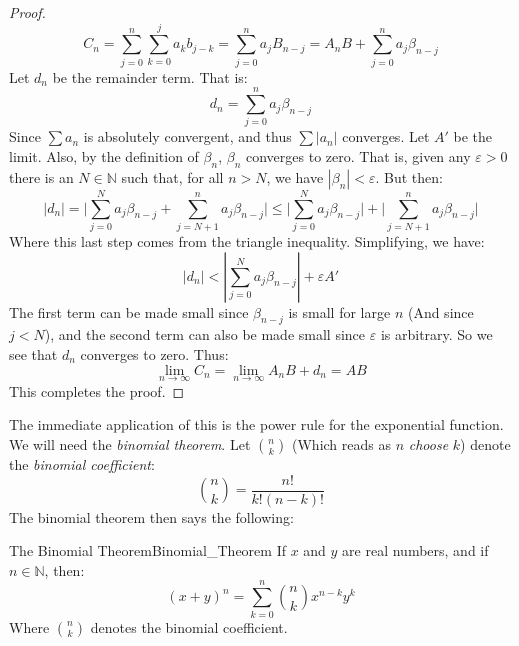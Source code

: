 \begin{proof}
\begin{equation}
            C_{n}=\sum_{j=0}^{n}\sum_{k=0}^{j}a_{k}b_{j-k}
                 =\sum_{j=0}^{n}a_{j}B_{n-j}
                 =A_{n}B+\sum_{j=0}^{n}a_{j}\beta_{n-j}
        \end{equation}
        Let $d_{n}$ be the remainder term. That is:
        \begin{equation}
            d_{n}=\sum_{j=0}^{n}a_{j}\beta_{n-j}
        \end{equation}
        Since $\sum{a}_{n}$ is absolutely convergent, and thus
        $\sum|a_{n}|$ converges. Let $A'$ be the limit. Also, by the
        definition of $\beta_{n}$, $\beta_{n}$ converges to zero. That
        is, given any $\varepsilon>0$ there is an $N\in\mathbb{N}$ such
        that, for all $n>N$, we have $|\beta_{n}|<\varepsilon$.
        But then:
        \begin{equation}
            |d_{n}|=\Big|\sum_{j=0}^{N}a_{j}\beta_{n-j}+
                         \sum_{j=N+1}^{n}a_{j}\beta_{n-j}\Big|
                \leq\Big|\sum_{j=0}^{N}a_{j}\beta_{n-j}\Big|
                   +\Big|\sum_{j=N+1}^{n}a_{j}\beta_{n-j}\Big|
        \end{equation}
        Where this last step comes from the triangle inequality.
        Simplifying, we have:
        \begin{equation}
            |d_{n}|<|\sum_{j=0}^{N}a_{j}\beta_{n-j}|+\varepsilon{A}'
        \end{equation}
        The first term can be made small since $\beta_{n-j}$ is small
        for large $n$ (And since $j<N$), and the second term can also
        be made small since $\varepsilon$ is arbitrary. So we see that
        $d_{n}$ converges to zero. Thus:
        \begin{equation}
            \underset{n\rightarrow\infty}{\lim}C_{n}
            =\underset{n\rightarrow\infty}{\lim}A_{n}B+d_{n}
            =AB
        \end{equation}
        This completes the proof.
    \end{proof}
    The immediate application of this is the power
    rule for the exponential function. We will need the
    \textit{binomial theorem}. Let $\binom{n}{k}$ (Which reads as
    $n$ \textit{choose} $k$) denote the \textit{binomial coefficient}:
    \begin{equation}
        \binom{n}{k}=\frac{n!}{k!(n-k)!}
    \end{equation}
    The binomial theorem then says the following:
    \begin{ltheorem}{The Binomial Theorem}{Binomial_Theorem}
        If $x$ and $y$ are real numbers, and if $n\in\mathbb{N}$, then:
        \begin{equation}
            (x+y)^{n}=\sum_{k=0}^{n}\binom{n}{k}x^{n-k}y^{k}
        \end{equation}
        Where $\binom{n}{k}$ denotes the binomial coefficient.
    \end{ltheorem}
